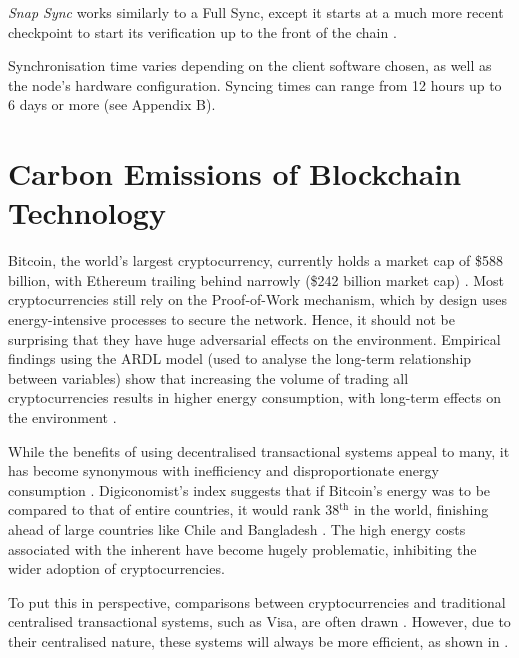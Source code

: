 \textit{Snap Sync} works similarly to a Full Sync, except it starts at a much more recent checkpoint to start its verification up to the front of the chain \cite{2022DeveloperGo-ethereum}.

Synchronisation time varies depending on the client software chosen, as well as the node's hardware configuration. Syncing times can range from 12 hours up to 6 days or more (see Appendix B).



\section{Carbon Emissions of Blockchain Technology }

Bitcoin, the world's largest cryptocurrency, currently holds a market cap of \$588 billion, with Ethereum trailing behind narrowly (\$242 billion market cap) \cite{BitcoinCoinMarketCap}. Most cryptocurrencies still rely on the Proof-of-Work mechanism, which by design uses energy-intensive processes to secure the network. Hence, it should not be surprising that they have huge adversarial effects on the environment. Empirical findings using the ARDL model (used to analyse the long-term relationship between variables) show that increasing the volume of trading all cryptocurrencies results in higher energy consumption, with long-term effects on the environment \cite{Schinckus2020Crypto-currenciesConsumption}. 

While the benefits of using decentralised transactional systems appeal to many, it has become synonymous with inefficiency and disproportionate energy consumption \cite{DeVriesBitcoinsProblem}. Digiconomist's index suggests that if Bitcoin's energy was to be compared to that of entire countries, it would rank 38$\mathrm{^{th}}$ in the world, finishing ahead of large countries like Chile and Bangladesh \cite{BitcoinDigiconomist}. The high energy costs associated with the inherent have become hugely problematic, inhibiting the wider adoption of cryptocurrencies. 

To put this in perspective, comparisons between cryptocurrencies and traditional centralised transactional systems, such as Visa, are often drawn \cite{Kohli2023AnSolutions}. However, due to their centralised nature, these systems will always be more efficient, as shown in .

